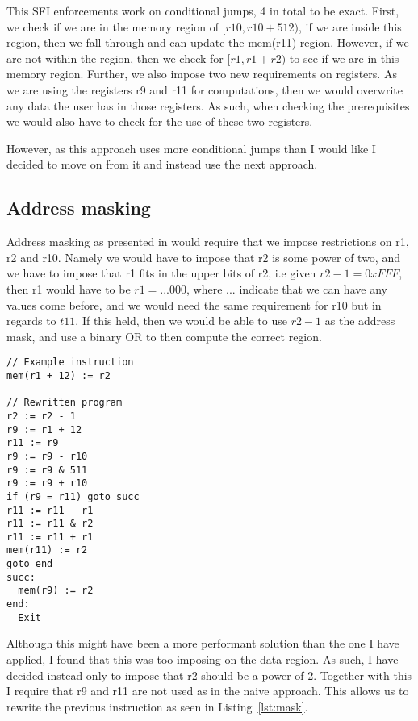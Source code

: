 This SFI enforcements work on conditional jumps, 4 in total to be exact. First,
we check if we are in the memory region of $[r10, r10 + 512)$, if we are inside
this region, then we fall through and can update the mem(r11) region. However,
if we are not within the region, then we check for $[r1, r1+r2)$ to see if we
are in this memory region. Further, we also impose two new requirements on
registers. As we are using the registers r9 and r11 for computations, then we
would overwrite any data the user has in those registers. As such, when
checking the prerequisites we would also have to check for the use of these two
registers.

However, as this approach uses more conditional jumps than I would like I
decided to move on from it and instead use the next approach.

\subsection{Address masking}
Address masking as presented in \cite{SFI} would require that we impose
restrictions on r1, r2 and r10. Namely we would have to impose that r2 is some
power of two, and we have to impose that r1 fits in the upper bits of r2, i.e
given $r2 - 1 = 0xFFF$, then r1 would have to be $r1=...000$, where ...
indicate that we can have any values come before, and we would need the same
requirement for r10 but in regards to $t11$. If this held, then we would be
able to use $r2-1$ as the address mask, and use a binary OR to then compute the
correct region.

\begin{lstlisting}[caption={Example program}, label={lst:mask}, mathescape=true]
// Example instruction
mem(r1 + 12) := r2

// Rewritten program
r2 := r2 - 1
r9 := r1 + 12
r11 := r9
r9 := r9 - r10
r9 := r9 & 511
r9 := r9 + r10
if (r9 = r11) goto succ
r11 := r11 - r1
r11 := r11 & r2
r11 := r11 + r1
mem(r11) := r2
goto end
succ:
  mem(r9) := r2
end:
  Exit
\end{lstlisting}

Although this might have been a more performant solution than the one I have
applied, I found that this was too imposing on the data region. As such, I have
decided instead only to impose that r2 should be a power of 2. Together with
this I require that r9 and r11 are not used as in the naive approach. This
allows us to rewrite the previous instruction as seen in Listing~\ref{lst:mask}.
